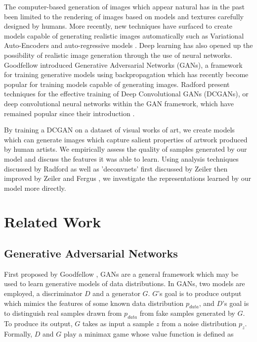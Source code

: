 \documentclass[10pt,twocolumn,letterpaper]{article}
\begin{document}
The computer-based generation of images which appear natural has in the past been limited to
the rendering of images based on models and textures carefully designed by humans. More recently, new techniques have surfaced to create models capable of generating realistic images automatically such as Variational Auto-Encoders \cite{kingma2013auto, kingma2014semi} and auto-regressive models \cite{larochelle2011neural, germain2015made}. Deep learning has also opened up the possibility of realistic image generation through the use of neural networks. Goodfellow \etal \cite{goodfellow2014generative} introduced Generative Adversarial Networks
(GANs), a framework for training generative models using backpropagation which has recently become popular for training models capable of generating images\cite{huang2017stacked, denton2015deep, reed2016generative}. Radford \etal \cite{radford2015unsupervised} present techniques for the effective training of Deep Convolutional GANs (DCGANs), or deep convolutional neural networks within the GAN framework, which have remained popular since their introduction \cite{gulrajani2017improved, reed2016generative, arjovsky2017wasserstein}.

By training a DCGAN on a dataset of visual works of art, we create models which can generate images
which capture salient properties of artwork produced by human artists. We empirically assess the
quality of samples generated by our model and discuss the features it was able to learn.
Using analysis techniques discussed by Radford \etal \cite{radford2015unsupervised} as well as 'deconvnets' first discussed by Zeiler \cite{zeiler2011adaptive} then improved by Zeiler and Fergus \cite{zeiler2014visualizing}, we investigate the representations learned by our model more directly.

\section{Related Work}
\subsection{Generative Adversarial Networks}
First proposed by Goodfellow \etal \cite{goodfellow2014generative}, GANs are a general
framework which may be used to learn generative models of data distributions. In GANs, two models
are employed, a discriminator $ D $ and a generator $ G $. $ G $'s goal is to produce output
which mimics the features of some known data distribution $ p_{data} $, and $ D $'s goal is to distinguish
real samples drawn from $ p_{data} $ from fake samples generated by $ G $. To produce its output, $ G $
takes as input a sample $ z $ from a noise distribution $ p_{z} $. Formally, $ D $ and $ G $ play
a minimax game whose value function is defined as
\end{document}
